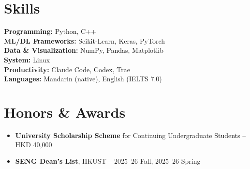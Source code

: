 \documentclass{common/resume}
\begin{document}
\section{Skills}

\textbf{Programming:} Python, C++ \\
\textbf{ML/DL Frameworks:} Scikit-Learn, Keras, PyTorch \\
\textbf{Data \& Visualization:} NumPy, Pandas, Matplotlib \\
\textbf{System:} Linux \\
\textbf{Productivity:} Claude Code, Codex, Trae \\
\textbf{Languages:} Mandarin (native), English (IELTS 7.0)

\section{Honors \& Awards}

\begin{itemize}
  \item \textbf{University Scholarship Scheme} for Continuing Undergraduate Students -- HKD 40,000
  \item \textbf{SENG Dean's List}, HKUST -- 2025--26 Fall, 2025--26 Spring
\end{itemize}
\end{document}
